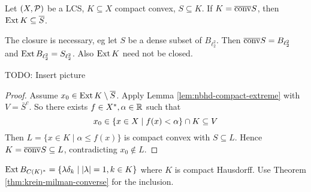 \documentclass{article}
\begin{document}
\begin{thm}\label{thm:krein-milman-converse}
  Let $(X, \mathcal P)$ be a LCS, $K \subseteq X$ compact convex, $S \subseteq K$. If $K = \overline{\operatorname{conv}} S$, then $\operatorname{Ext} K \subseteq \overline{S}$.
\end{thm}
\begin{rmk}
  The closure is necessary, eg let $S$ be a dense subset of $B_{\ell_2^2}$. Then $\overline{\operatorname{conv}} S = B_{\ell_2^2}$ and $\operatorname{Ext} B_{\ell_2^2} = S_{\ell_2^2}$. Also $\operatorname{Ext} K$ need not be closed.

  TODO: Insert picture
\end{rmk}
\begin{proof}
  Assume $x_0 \in \operatorname{Ext} K \setminus \overline{S}$. Apply Lemma \ref{lem:nbhd-compact-extreme} with $V = \bar S^c$. So there exists $f \in X^*, \alpha \in \mathbb R$ such that
  $$x_0 \in \{x \in X \mid f(x) < \alpha\} \cap K \subseteq V$$
  Then $L = \{x \in K \mid \alpha \le f(x)\}$ is compact convex with $S \subseteq L$. Hence $K = \overline{\operatorname{conv}} S \subseteq L$, contradicting $x_0 \nin L$.
\end{proof}

\begin{ex}
  $\operatorname{Ext} B_{C(K)^*} = \{\lambda \delta_k \mid \left\lvert \lambda\right\rvert = 1, k \in K\}$ where $K$ is compact Hausdorff. Use Theorem \ref{thm:krein-milman-converse} for the inclusion.
\end{ex}
\end{document}
